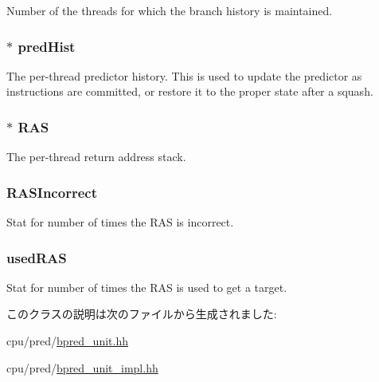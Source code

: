 \label{classBPredUnit_a82dc714137537bc6ed526164d95f6674}
Number of the threads for which the branch history is maintained. \hypertarget{classBPredUnit_a17866949610525907d51191ce3271e73}{
\subsubsection[{predHist}]{$\ast$ {\bf predHist}}}
\label{classBPredUnit_a17866949610525907d51191ce3271e73}
The per-\/thread predictor history. This is used to update the predictor as instructions are committed, or restore it to the proper state after a squash. \hypertarget{classBPredUnit_aaff600a1f8b1b71ac7636e62cb7319dd}{
\subsubsection[{RAS}]{$\ast$ {\bf RAS}}}
\label{classBPredUnit_aaff600a1f8b1b71ac7636e62cb7319dd}
The per-\/thread return address stack. \hypertarget{classBPredUnit_a8f16f8a930ca557e2a627a4dfa15e67f}{
\subsubsection[{RASIncorrect}]{ {\bf RASIncorrect}}}
\label{classBPredUnit_a8f16f8a930ca557e2a627a4dfa15e67f}
Stat for number of times the RAS is incorrect. \hypertarget{classBPredUnit_af589fa2a7ce83147ab8c0d4169c0748f}{
\subsubsection[{usedRAS}]{ {\bf usedRAS}}}
\label{classBPredUnit_af589fa2a7ce83147ab8c0d4169c0748f}
Stat for number of times the RAS is used to get a target. 

このクラスの説明は次のファイルから生成されました:\begin{DoxyCompactItemize}
\item 
cpu/pred/\hyperlink{bpred__unit_8hh}{bpred\_\-unit.hh}\item 
cpu/pred/\hyperlink{bpred__unit__impl_8hh}{bpred\_\-unit\_\-impl.hh}\end{DoxyCompactItemize}
